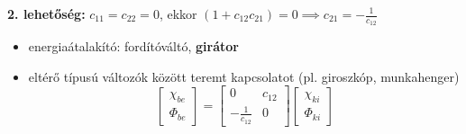 \noindent \textbf{2. lehetőség:} $c_{11} = c_{22} = 0$, ekkor $(1 + c_{12}c_{21}) = 0 \implies c_{21} = - \frac{1}{c_{12}}$
\begin{itemize}
    \item energiaátalakító: fordítóváltó, \textbf{girátor}
    \item eltérő típusú változók között teremt kapcsolatot (pl. giroszkóp, munkahenger)
    $$ \begin{bmatrix} \chi_{be} \\ \Phi_{be} \end{bmatrix} = \begin{bmatrix} 0 & c_{12} \\ -\frac{1}{c_{12}} & 0 \end{bmatrix} \begin{bmatrix} \chi_{ki} \\ \Phi_{ki} \end{bmatrix} $$
\end{itemize}
